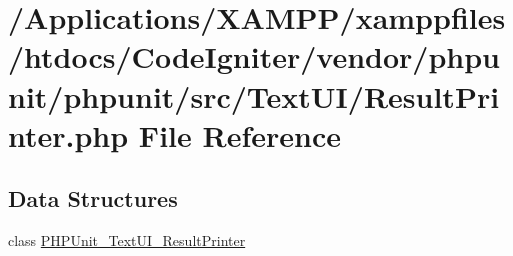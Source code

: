 \hypertarget{_text_u_i_2_result_printer_8php}{}\section{/\+Applications/\+X\+A\+M\+P\+P/xamppfiles/htdocs/\+Code\+Igniter/vendor/phpunit/phpunit/src/\+Text\+U\+I/\+Result\+Printer.php File Reference}
\label{_text_u_i_2_result_printer_8php}
\subsection*{Data Structures}
\begin{DoxyCompactItemize}
\item 
class \mbox{\hyperlink{class_p_h_p_unit___text_u_i___result_printer}{P\+H\+P\+Unit\+\_\+\+Text\+U\+I\+\_\+\+Result\+Printer}}
\end{DoxyCompactItemize}
